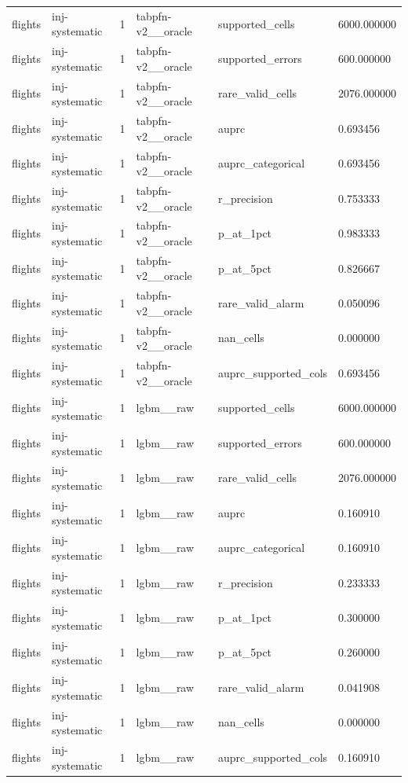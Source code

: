 \begin{tabular}{llllll}
flights & inj-systematic & 1 & tabpfn-v2\_\_oracle & supported\_cells & 6000.000000 \\
flights & inj-systematic & 1 & tabpfn-v2\_\_oracle & supported\_errors & 600.000000 \\
flights & inj-systematic & 1 & tabpfn-v2\_\_oracle & rare\_valid\_cells & 2076.000000 \\
flights & inj-systematic & 1 & tabpfn-v2\_\_oracle & auprc & 0.693456 \\
flights & inj-systematic & 1 & tabpfn-v2\_\_oracle & auprc\_categorical & 0.693456 \\
flights & inj-systematic & 1 & tabpfn-v2\_\_oracle & r\_precision & 0.753333 \\
flights & inj-systematic & 1 & tabpfn-v2\_\_oracle & p\_at\_1pct & 0.983333 \\
flights & inj-systematic & 1 & tabpfn-v2\_\_oracle & p\_at\_5pct & 0.826667 \\
flights & inj-systematic & 1 & tabpfn-v2\_\_oracle & rare\_valid\_alarm & 0.050096 \\
flights & inj-systematic & 1 & tabpfn-v2\_\_oracle & nan\_cells & 0.000000 \\
flights & inj-systematic & 1 & tabpfn-v2\_\_oracle & auprc\_supported\_cols & 0.693456 \\
flights & inj-systematic & 1 & lgbm\_\_raw & supported\_cells & 6000.000000 \\
flights & inj-systematic & 1 & lgbm\_\_raw & supported\_errors & 600.000000 \\
flights & inj-systematic & 1 & lgbm\_\_raw & rare\_valid\_cells & 2076.000000 \\
flights & inj-systematic & 1 & lgbm\_\_raw & auprc & 0.160910 \\
flights & inj-systematic & 1 & lgbm\_\_raw & auprc\_categorical & 0.160910 \\
flights & inj-systematic & 1 & lgbm\_\_raw & r\_precision & 0.233333 \\
flights & inj-systematic & 1 & lgbm\_\_raw & p\_at\_1pct & 0.300000 \\
flights & inj-systematic & 1 & lgbm\_\_raw & p\_at\_5pct & 0.260000 \\
flights & inj-systematic & 1 & lgbm\_\_raw & rare\_valid\_alarm & 0.041908 \\
flights & inj-systematic & 1 & lgbm\_\_raw & nan\_cells & 0.000000 \\
flights & inj-systematic & 1 & lgbm\_\_raw & auprc\_supported\_cols & 0.160910 \\

\end{tabular}
